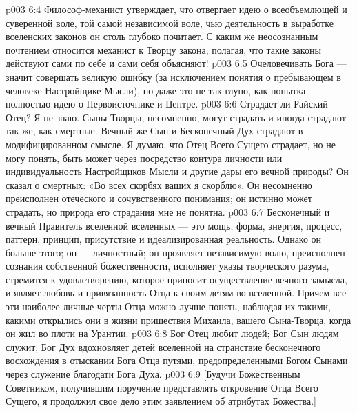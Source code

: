 \vs p003 6:4 Философ\hyp{}механист утверждает, что отвергает идею о всеобъемлющей и суверенной воле, той самой независимой воле, чью деятельность в выработке вселенских законов он столь глубоко почитает. С каким же неосознанным почтением относится механист к Творцу закона, полагая, что такие законы действуют сами по себе и сами себя объясняют!
\vs p003 6:5 Очеловечивать Бога --- значит совершать великую ошибку (за исключением понятия о пребывающем в человеке Настройщике Мысли), но даже это не так глупо, как попытка полностью  идею о Первоисточнике и Центре.
\vs p003 6:6 \pc Страдает ли Райский Отец? Я не знаю. Сыны\hyp{}Творцы, несомненно, могут страдать и иногда страдают так же, как смертные. Вечный же Сын и Бесконечный Дух страдают в модифицированном смысле. Я думаю, что Отец Всего Сущего страдает, но не могу понять,  быть может через посредство контура личности или индивидуальность Настройщиков Мысли и другие дары его вечной природы? Он сказал о смертных: «Во всех скорбях ваших я скорблю». Он несомненно преисполнен отеческого и сочувственного понимания; он истинно может страдать, но природа его страдания мне не понятна.
\vs p003 6:7 \pc Бесконечный и вечный Правитель вселенной вселенных --- это мощь, форма, энергия, процесс, паттерн, принцип, присутствие и идеализированная реальность. Однако он больше этого; он --- личностный; он проявляет независимую волю, преисполнен сознания собственной божественности, исполняет указы творческого разума, стремится к удовлетворению, которое приносит осуществление вечного замысла, и являет любовь и привязанность Отца к своим детям во вселенной. Причем все эти наиболее личные черты Отца можно лучше понять, наблюдая их такими, какими открылись они в жизни пришествия Михаила, вашего Сына\hyp{}Творца, когда он жил во плоти на Урантии.
\vs p003 6:8 \pc Бог Отец любит людей; Бог Сын людям служит; Бог Дух вдохновляет детей вселенной на странствие бесконечного восхождения в отыскании Бога Отца путями, предопределенными Богом Сынами через служение благодати Бога Духа.
\vsetoff
\vs p003 6:9 [Будучи Божественным Советником, получившим поручение представлять откровение Отца Всего Сущего, я продолжил свое дело этим заявлением об атрибутах Божества.]
